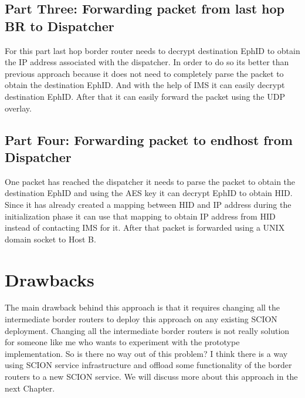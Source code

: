 \subsection{Part Three: Forwarding packet from last hop BR to Dispatcher}
For this part last hop border router needs to decrypt destination EphID to obtain the IP address associated with the dispatcher. In order to do so its better than previous approach because it does not need to completely parse the packet to obtain the destination EphID. And with the help of IMS it can easily decrypt destination EphID. After that it can easily forward the packet using the UDP overlay.

\subsection{Part Four: Forwarding packet to endhost from Dispatcher}
One packet has reached the dispatcher it needs to parse the packet to obtain the destination EphID and using the AES key it can decrypt EphID to obtain HID. Since it has already created a mapping between HID and IP address during the initialization phase it can use that mapping to obtain IP address from HID instead of contacting IMS for it. After that packet is forwarded using a UNIX domain socket to Host B.

  

\section{Drawbacks} \label{addr:drawback}
The main drawback behind this approach is that it requires changing all the intermediate border routers to deploy this approach on any existing SCION deployment. Changing all the intermediate border routers is not really solution for someone like me who wants to experiment with the prototype implementation. So is there no way out of this problem? I think there is a way using SCION service infrastructure and offload some functionality of the border routers to a new SCION service. We will discuss more about this approach in the next Chapter.
